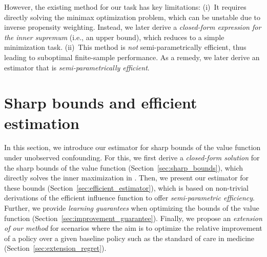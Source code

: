 \documentclass{article} %
\theoremstyle{plain}
\theoremstyle{definition}
\theoremstyle{remark}
\begin{document}
However, the existing method \citep{Kallus.2018c,Kallus.2021d} for our task has key limitations: (i)~It requires directly solving the minimax optimization problem, which can be unstable due to inverse propensity weighting. Instead, we later derive a \emph{closed-form expression for the inner supremum} (i.e., an upper bound), which reduces  to a simple minimization task. (ii)~This method is \emph{not} semi-parametrically efficient, thus leading to suboptimal finite-sample performance. As a remedy, we later derive an estimator that is \emph{semi-parametrically efficient}.



\section{Sharp bounds and efficient estimation}

In this section, we introduce our estimator for sharp bounds of the value function under unobserved confounding. For this, we first derive a \emph{closed-form solution} for the {sharp bounds of the value function} (Section~\ref{sec:sharp_bounds}), which directly solves the inner maximization in . Then, we present our {estimator} for these bounds (Section~\ref{sec:efficient_estimator}), which is based on non-trivial derivations of the efficient influence function to offer \emph{semi-parametric efficiency}. Further, we provide \emph{learning guarantees} when optimizing the bounds of the value function (Section~\ref{sec:improvement_guarantee}). Finally, we propose an \emph{extension of our method} for scenarios where the aim is to optimize the relative improvement of a policy over a given baseline policy such as the standard of care in medicine (Section~\ref{sec:extension_regret}).
\end{document}
